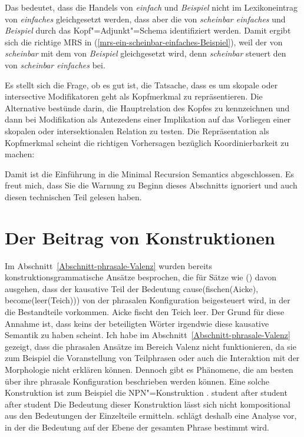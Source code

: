 \noindent
Das bedeutet, dass die Handels von \emph{einfach} und \emph{Beispiel} nicht im
Lexikoneintrag von \emph{einfaches} gleichgesetzt werden, dass aber die \ltopwe von \emph{scheinbar
  einfaches} und \emph{Beispiel} durch das Kopf"=Adjunkt"=Schema identifiziert werden. Damit ergibt
sich die richtige MRS in (\ref{mrs-ein-scheinbar-einfaches-Beispiel}), weil der \ltopw von
\emph{scheinbar} mit dem von \emph{Beispiel} gleichgesetzt wird, denn \emph{scheinbar} steuert
den \ltopw von \emph{scheinbar einfaches} bei.

Es stellt sich die Frage, ob es gut ist, die Tatsache, dass es um skopale oder intersective
Modifikatoren geht als Kopfmerkmal zu repräsentieren. Die Alternative bestünde darin, die
Hauptrelation des Kopfes zu kennzeichnen und dann bei Modifikation als Antezedens einer Implikation
auf das Vorliegen einer skopalen oder intersektionalen Relation zu testen. Die Repräsentation als
Kopfmerkmal scheint die richtigen Vorhersagen bezüglich Koordinierbarkeit zu machen:
\eal
{}
\zl


Damit ist die Einführung in die Minimal Recursion Semantics abgeschlossen. Es freut mich, dass Sie
die Warnung zu Beginn dieses Abschnitts ignoriert und auch diesen technischen Teil gelesen haben.

%


\section{Der Beitrag von Konstruktionen}

Im Abschnitt~\ref{Abschnitt-phrasale-Valenz} wurden bereits konstruktionsgrammatische Ansätze
besprochen, die für Sätze wie () davon ausgehen, dass der kausative Teil der Bedeutung
cause(fischen(Aicke), become(leer(Teich))) von der phrasalen Konfiguration beigesteuert wird, in der
die Bestandteile vorkommen.
\ea
Aicke fischt den Teich leer.
\z
Der Grund für diese Annahme ist, dass keins der beteiligten Wörter irgendwie diese kausative
Semantik zu haben scheint. Ich habe im Abschnitt~\ref{Abschnitt-phrasale-Valenz} gezeigt, dass die
phrasalen Ansätze im Bereich Valenz nicht funktionieren, da sie zum Beispiel die Voranstellung von
Teilphrasen oder auch die Interaktion mit der Morphologie nicht erklären können. Dennoch gibt es
Phänomene, die am besten über ihre phrasale Konfiguration beschrieben werden können. Eine solche
Konstruktion ist zum Beispiel die NPN"=Konstruktion \citep{Matsuyama2004a,Jackendoff2008a,Bargmann2015a}.
\ea
student after student after student
\z
Die Bedeutung dieser Konstruktion lässt sich nicht kompositional aus den Bedeutungen der Einzelteile
ermitteln. \citet{Bargmann2015a} schlägt deshalb eine Analyse vor, in der die Bedeutung auf der
Ebene der gesamten Phrase bestimmt wird.

